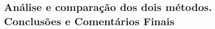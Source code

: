 \documentclass[a4paper,12pt]{article}  %
\begin{document}
\subsection{\sf Análise e comparação dos dois métodos. Conclusões e Comentários Finais}
\noindent\underline{\makebox[\textwidth][r]{~}} \\
\noindent\underline{\makebox[\textwidth][r]{~}} \\
\noindent\underline{\makebox[\textwidth][r]{~}} \\
\noindent\underline{\makebox[\textwidth][r]{~}} \\
\noindent\underline{\makebox[\textwidth][r]{~}} \\
\noindent\underline{\makebox[\textwidth][r]{~}} \\
\noindent\underline{\makebox[\textwidth][r]{~}} \\
\noindent\underline{\makebox[\textwidth][r]{~}} \\
\noindent\underline{\makebox[\textwidth][r]{~}} \\
\noindent\underline{\makebox[\textwidth][r]{~}} \\
\noindent\underline{\makebox[\textwidth][r]{~}} \\
\noindent\underline{\makebox[\textwidth][r]{~}} \\
\noindent\underline{\makebox[\textwidth][r]{~}} \\
\noindent\underline{\makebox[\textwidth][r]{~}} \\
\noindent\underline{\makebox[\textwidth][r]{~}} \\
\noindent\underline{\makebox[\textwidth][r]{~}} \\
\noindent\underline{\makebox[\textwidth][r]{~}} \\
\noindent\underline{\makebox[\textwidth][r]{~}} \\
\noindent\underline{\makebox[16.2cm][r]{~}} \\



\end{document}
